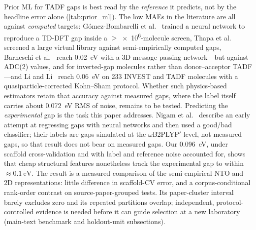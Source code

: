 \documentclass[final,3p,times,twocolumn]{elsarticle}
\begin{document}
Prior ML for TADF gaps is best read by the \emph{reference} it predicts, not by
the headline error alone (\cref{tab:prior_ml}). The low MAEs in the literature are
all against \emph{computed} targets: G\'omez-Bombarelli et
al.~\cite{Gomez-Bombarelli2016} trained a neural network to reproduce a TD-DFT gap
inside a $>$\num{e6}-molecule screen, Thapa et al.~\cite{Thapa2025} screened a
large virtual library against semi-empirically computed gaps, Barneschi et al.~\cite{Barneschi2024}
reach \qty{0.02}{\electronvolt} with a 3D message-passing network---but against
ADC(2) values, and for inverted-gap molecules rather than donor--acceptor TADF---and
Li and Li~\cite{Li2026} reach \qty{0.06}{\electronvolt} on \num{233} INVEST and TADF
molecules with a quasiparticle-corrected Kohn--Sham protocol. Whether such
physics-based estimators retain that accuracy against measured gaps, where the label
itself carries about \qty{0.072}{\electronvolt} RMS of noise, remains to be tested.
Predicting the \emph{experimental} gap is the task this paper addresses.
Nigam et al.~\cite{Nigam2024} describe an early attempt at regressing gaps with neural
networks and then used a good/bad classifier; their labels are gaps simulated at the
$\omega$B2PLYP$'$ level, not measured gaps, so that result does not bear on measured gaps. Our
\qty{0.096}{\electronvolt}, under scaffold cross-validation and with label and
reference noise accounted for, shows that cheap structural features nonetheless
track the experimental gap to within $\approx\qty{0.1}{\electronvolt}$. The result is a measured comparison of the
semi-empirical NTO and 2D representations: little difference in scaffold-CV error,
and a corpus-conditional rank-order contrast on source-paper-grouped tests. Its
paper-cluster interval barely excludes zero and its repeated partitions overlap;
independent, protocol-controlled evidence is needed before it can guide selection
at a new laboratory (main-text benchmark and holdout-unit subsections).
\end{document}
